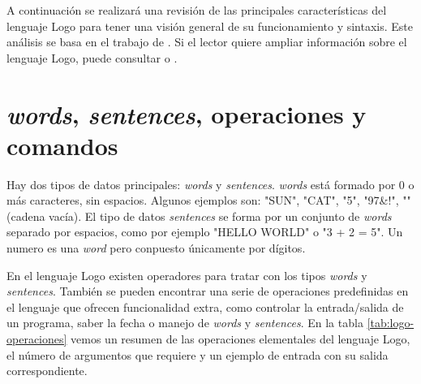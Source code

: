 A continuación se realizará una revisión de las principales características del lenguaje Logo para tener una visión general de su funcionamiento y sintaxis. Este análisis se basa en el trabajo de \cite[p.274-305]{feurzeig1969programming}. Si el lector quiere ampliar información sobre el lenguaje Logo, puede consultar \cite{friendly2014advanced} o \cite{logo-resources}.


\section*{\emph{words}, \emph{sentences}, operaciones y comandos}

Hay dos tipos de datos principales: \emph{words} y \emph{sentences}. \emph{words} está formado por 0 o más caracteres, sin espacios. Algunos ejemplos son: "SUN", "CAT", "5",  "97&!", "" (cadena vacía). El tipo de datos \emph{sentences} se forma por un conjunto de \emph{words} separado por espacios, como por ejemplo "HELLO WORLD" o "3 + 2 = 5". Un numero es una \emph{word} pero conpuesto únicamente por dígitos.

En el lenguaje Logo existen operadores para tratar con los tipos \emph{words} y \emph{sentences}. También se pueden encontrar una serie de operaciones predefinidas en el lenguaje que ofrecen funcionalidad extra, como controlar la entrada/salida de un programa, saber la fecha o manejo de \emph{words} y \emph{sentences}. En la tabla \ref{tab:logo-operaciones} vemos un resumen de las operaciones elementales del lenguaje Logo, el número de argumentos que requiere y un ejemplo de entrada con su salida correspondiente.


